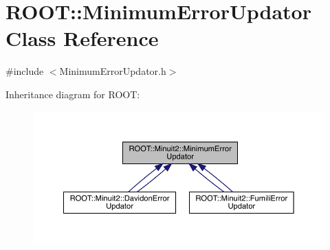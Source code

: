 \hypertarget{classROOT_1_1Minuit2_1_1MinimumErrorUpdator}{}\section{R\+O\+OT\+:\+:Minimum\+Error\+Updator Class Reference}
\label{classROOT_1_1Minuit2_1_1MinimumErrorUpdator}


{\ttfamily \#include $<$Minimum\+Error\+Updator.\+h$>$}



Inheritance diagram for R\+O\+OT\+:\nopagebreak
\begin{figure}[H]
\begin{center}
\leavevmode
\includegraphics[width=350pt]{d2/d43/classROOT_1_1Minuit2_1_1MinimumErrorUpdator__inherit__graph}
\end{center}
\end{figure}
